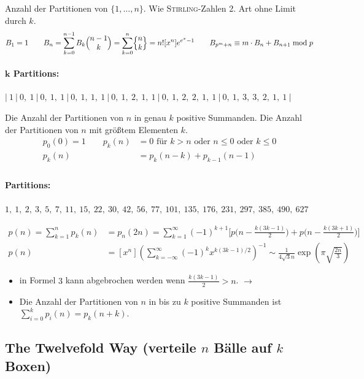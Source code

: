 Anzahl der Partitionen von $\{1, \ldots, n\}$.
Wie \textsc{Stirling}-Zahlen 2. Art ohne Limit durch $k$.
\[B_1 = 1 \qquad
B_n = \sum\limits_{k = 0}^{n - 1} B_k\Bigl( \begin{matrix} n-1 \\ k \end{matrix} \Bigr)
= \sum\limits_{k = 0}^{n}\Bigl\{ \begin{matrix} n \\ k \end{matrix} \Bigr\}
= n! [x^n] e^{e^x-1}
\qquad
B_{p^m+n}\equiv m\cdot B_n + B_{n+1} \bmod{p}\]

\paragraph{$\boldsymbol{k}$ Partitions:}
$|~1~|~0,~1~|~0,~1,~1~|~0,~1,~1,~1~|~0,~1,~2,~1,~1~|~0,~1,~2,~2,~1,~1~|~0,~1,~3,~3,~2,~1,~1~|$

Die Anzahl der Partitionen von $n$ in genau $k$ positive Summanden.
Die Anzahl der Partitionen von $n$ mit größtem Elementen $k$.
\begin{align*}
	p_0(0)=1 \qquad p_k(n)&=0 \text{ für } k > n \text{ oder } n \leq 0 \text{ oder } k \leq 0\\
	p_k(n)&= p_k(n-k) + p_{k-1}(n-1)\\
\end{align*}

\paragraph{Partitions:}
$1,~1,~2,~3,~5,~7,~11,~15,~22,~30,~42,~56,~77,~101,~135,~176,~231,~297,~385,~490,~627$

\begin{align*}
	p(n)=\sum_{k=1}^{n} p_k(n)&=p_n(2n)=\sum\limits_{k=1}^\infty(-1)^{k+1}\bigg[p\bigg(n - \frac{k(3k-1)}{2}\bigg) + p\bigg(n - \frac{k(3k+1)}{2}\bigg)\bigg] \\
	p(n)&=[x^n] \left(\sum_{k=-\infty}^\infty (-1)^k x^{k(3k-1)/2}\right)^{-1}
	  \sim \frac{1}{4 \sqrt{3} n} \exp\left(\pi \sqrt{\frac{2n}{3}}\right)
\end{align*}
\begin{itemize}
	\item in Formel $3$ kann abgebrochen werden wenn $\frac{k(3k-1)}{2} > n$.
		$\rightarrow$ 
	\item Die Anzahl der Partitionen von $n$ in bis zu $k$ positive Summanden ist $\sum\limits_{i=0}^{k}p_i(n)=p_k(n+k)$.
\end{itemize}

\subsection{The Twelvefold Way \textnormal{(verteile $n$ Bälle auf $k$ Boxen)}}


